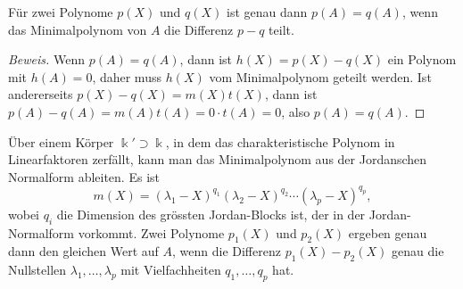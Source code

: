 \begin{satz}
Für zwei Polynome $p(X)$ und $q(X)$ ist genau dann $p(A)=q(A)$, wenn
das Minimalpolynom von $A$ die Differenz $p-q$ teilt.
\end{satz}

\begin{proof}[Beweis]
Wenn $p(A)=q(A)$, dann ist $h(X)=p(X)-q(X)$ ein Polynom mit $h(A)=0$,
daher muss $h(X)$ vom Minimalpolynom geteilt werden.
Ist andererseits $p(X)-q(X)=m(X)t(X)$, dann ist
$p(A)-q(A)=m(A)t(A)=0\cdot t(A) = 0$, also $p(A)=q(A)$.
\end{proof}

Über einem Körper $\Bbbk'\supset\Bbbk$, in dem das charakteristische
Polynom in Linearfaktoren zerfällt, kann man das Minimalpolynom aus
der Jordanschen Normalform ableiten.
Es ist
\[
m(X)
=
(\lambda_1-X)^{q_1}
(\lambda_2-X)^{q_2}
\cdots
(\lambda_p-X)^{q_p},
\]
wobei $q_i$ die Dimension des grössten Jordan-Blocks ist, der in der
Jordan-Normalform vorkommt.
Zwei Polynome $p_1(X)$ und $p_2(X)$ ergeben genau dann den gleichen Wert
auf $A$,
wenn die Differenz $p_1(X)-p_2(X)$ genau die Nullstellen
$\lambda_1,\dots,\lambda_p$ mit Vielfachheiten $q_1,\dots,q_p$ hat.

